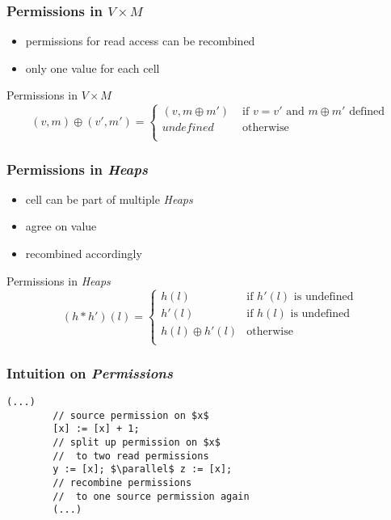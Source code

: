 \documentclass{beamer}
\begin{document}
	\begin{frame}
	\frametitle{Permissions in $V\times M$}
	\begin{itemize}
		\item permissions for read access can be recombined
		\item only one value for each cell
	\end{itemize}
	\begin{block}{Permissions in $V\times M$}
		$$(v, m)\oplus(v', m') =
			\begin{cases}
				(v, m\oplus m') &\text{ if }v = v'\text{ and }m\oplus m'\text{ defined} \\
				\textit{undefined} &\text{ otherwise}\\
			\end{cases}
		$$
	\end{block}
	\end{frame}

	\begin{frame}
	\frametitle{Permissions in \emph{Heaps}}
	\begin{itemize}
		\item cell can be part of multiple \emph{Heaps}
		\item agree on value
		\item recombined accordingly
	\end{itemize}
	\begin{block}{Permissions in \emph{Heaps}}
		$$ (h\ast h')(l) =
		\begin{cases}
			h(l)              &\text{if $h'(l)$ is undefined}\\
			h'(l)             &\text{if $h(l) $ is undefined}\\
			h(l) \oplus h'(l) &\text{otherwise}\\
		\end{cases}
		$$
	\end{block}
	\end{frame}

	\begin{frame}[fragile]
	\frametitle{Intuition on \emph{Permissions}}
	\begin{lstlisting}[mathescape]
		(...)
		// source permission on $x$
		[x] := [x] + 1;
		// split up permission on $x$
		//  to two read permissions
		y := [x]; $\parallel$ z := [x];
		// recombine permissions
		//  to one source permission again
		(...)
	\end{lstlisting}
	\end{frame}
\end{document}
